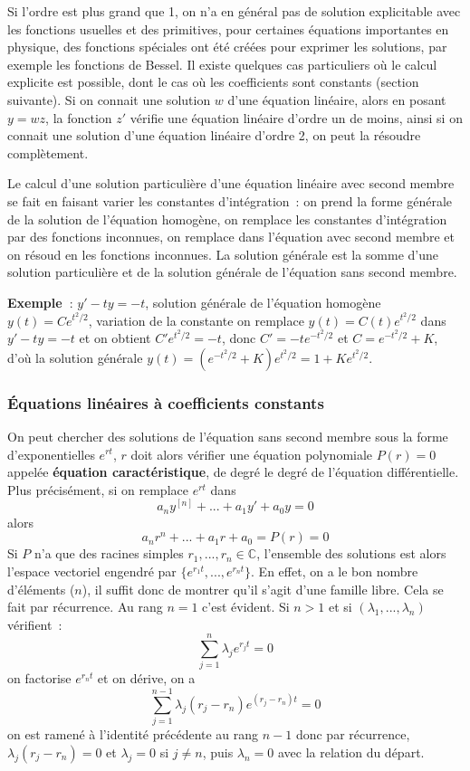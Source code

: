 \documentclass[a4paper,11pt]{article}
\newcommand{\C}{{\mathbb{C}}}
\begin{document}
Si l'ordre est plus grand que 1, on n'a en g\'en\'eral pas de solution
explicitable avec les fonctions usuelles et des primitives, 
pour certaines \'equations importantes en physique, 
des fonctions sp\'eciales
ont \'et\'e cr\'e\'ees pour exprimer les solutions, par
exemple les fonctions de Bessel. Il existe quelques
cas particuliers o\`u le calcul explicite est possible, dont
le cas o\`u les coefficients sont constants (section suivante).
Si on connait une solution $w$ d'une \'equation lin\'eaire, alors 
en posant $y=wz$, la fonction $z'$ v\'erifie une \'equation lin\'eaire
d'ordre un de moins, ainsi si on connait une solution d'une \'equation
lin\'eaire d'ordre 2, on peut la r\'esoudre compl\`etement.

Le calcul d'une solution particuli\`ere 
d'une \'equation lin\'eaire avec second
membre se fait en faisant varier les constantes d'int\'egration~:
on prend la forme g\'en\'erale de la solution de l'\'equation
homog\`ene,
on remplace les constantes d'int\'egration par des fonctions inconnues,
on remplace dans l'\'equation avec second membre et on
r\'esoud en les fonctions inconnues.
La solution g\'en\'erale est la somme d'une solution particuli\`ere
et de la solution g\'en\'erale de l'\'equation sans second membre.

{\bf Exemple~}: $y'-ty=-t$, solution g\'en\'erale de l'\'equation
homog\`ene $y(t)=Ce^{t^2/2}$, variation de la constante
on remplace $y(t)=C(t)e^{t^2/2}$ dans $y'-ty=-t$ et on obtient
$C' e^{t^2/2}=-t$, donc $C'=-te^{-t^2/2}$ et $C=e^{-t^2/2}+K$,
d'o\`u la solution g\'en\'erale $y(t)=(e^{-t^2/2}+K)e^{t^2/2}=1+Ke^{t^2/2}$.

\subsubsection{\'Equations lin\'eaires \`a coefficients constants}
On peut chercher des solutions de l'\'equation sans second membre
sous la forme d'exponentielles
$e^{rt}$, $r$ doit alors v\'erifier une \'equation polynomiale $P(r)=0$
appel\'ee {\bf \'equation caract\'eristique},
de degr\'e le degr\'e de l'\'equation diff\'erentielle. 
Plus pr\'ecis\'ement, si on remplace $e^{rt}$ dans
$$ a_n y^{[n]}+...+a_1 y'+a_0y=0$$ alors
$$ a_n r^n +...+a_1r +a_0=P(r)=0$$
Si  $P$ n'a que des racines simples $r_1,...,r_n \in \C$, 
l'ensemble des solutions
est alors l'espace vectoriel engendr\'e par 
$\{ e^{r_1t}, ... , e^{r_nt} \}$.
En effet, on a le bon nombre
d'\'el\'ements ($n$), il suffit donc de montrer 
qu'il s'agit d'une famille libre. Cela se fait
par r\'ecurrence. Au rang $n=1$ c'est \'evident.
Si $n>1$ et si $(\lambda_1,...,\lambda_n)$ v\'erifient~:
$$ \sum_{j=1}^n \lambda_j e^{r_jt} = 0$$
on factorise $e^{r_n t}$ et on d\'erive, on a
$$ \sum_{j=1}^{n-1} \lambda_j (r_j-r_n) e^{(r_j-r_n)t} =0 $$
on est ramen\'e \`a l'identit\'e pr\'ec\'edente au rang $n-1$
donc par r\'ecurrence, $\lambda_j (r_j-r_n)=0$ et $\lambda_j=0$
si $j \neq n$, puis $\lambda_n=0$ avec la relation du d\'epart.
\end{document}
